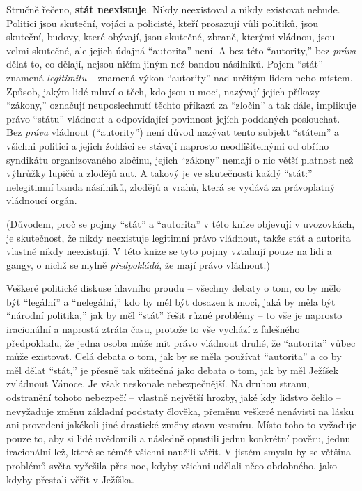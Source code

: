 \documentclass{book}
\begin{document}
Stručně řečeno, \textbf{stát neexistuje}. Nikdy neexistoval a nikdy existovat nebude. Politici jsou skuteční, vojáci a policisté, kteří prosazují vůli politiků, jsou skuteční, budovy, které obývají, jsou skutečné, zbraně, kterými vládnou, jsou velmi skutečné, ale jejich údajná \enquote{autorita} není. A bez této \enquote{autority,} bez \emph{práva} dělat to, co dělají, nejsou ničím jiným než bandou násilníků. Pojem \enquote{stát} znamená \emph{legitimitu} -- znamená výkon \enquote{autority} nad určitým lidem nebo místem. Způsob, jakým lidé mluví o těch, kdo jsou u moci, nazývají jejich příkazy \enquote{zákony,} označují neuposlechnutí těchto příkazů za \enquote{zločin} a tak dále, implikuje právo \enquote{státu} vládnout a odpovídající povinnost jejích poddaných poslouchat. Bez \emph{práva} vládnout (\enquote{autority}) není důvod nazývat tento subjekt \enquote{státem} a všichni politici a jejich žoldáci se stávají naprosto neodlišitelnými od obřího syndikátu organizovaného zločinu, jejich \enquote{zákony} nemají o nic větší platnost než výhrůžky lupičů a zlodějů aut. A takový je ve skutečnosti každý \enquote{stát:} nelegitimní banda násilníků, zlodějů a vrahů, která se vydává za právoplatný vládnoucí orgán.

(Důvodem, proč se pojmy \enquote{stát} a \enquote{autorita} v této knize objevují v uvozovkách, je skutečnost, že nikdy neexistuje legitimní právo vládnout, takže stát a autorita vlastně nikdy neexistují. V této knize se tyto pojmy vztahují pouze na lidi a gangy, o nichž se mylně \emph{předpokládá}, že mají právo vládnout.)

Veškeré politické diskuse hlavního proudu -- všechny debaty o tom, co by mělo být \enquote{legální} a \enquote{nelegální,} kdo by měl být dosazen k moci, jaká by měla být \enquote{národní politika,} jak by měl \enquote{stát} řešit různé problémy -- to vše je naprosto iracionální a naprostá ztráta času, protože to vše vychází z falešného předpokladu, že jedna osoba může mít právo vládnout druhé, že \enquote{autorita} vůbec může existovat. Celá debata o tom, jak by se měla používat \enquote{autorita} a co by měl dělat \enquote{stát,} je přesně tak užitečná jako debata o tom, jak by měl Ježíšek zvládnout Vánoce. Je však neskonale nebezpečnější. Na druhou stranu, odstranění tohoto nebezpečí -- vlastně největší hrozby, jaké kdy lidstvo čelilo -- nevyžaduje změnu základní podstaty člověka, přeměnu veškeré nenávisti na lásku ani provedení jakékoli jiné drastické změny stavu vesmíru. Místo toho to vyžaduje pouze to, aby si lidé uvědomili a následně opustili jednu konkrétní pověru, jednu iracionální lež, které se téměř všichni naučili věřit. V jistém smyslu by se většina problémů světa vyřešila přes noc, kdyby všichni udělali něco obdobného, jako kdyby přestali věřit v Ježíška.
\end{document}
